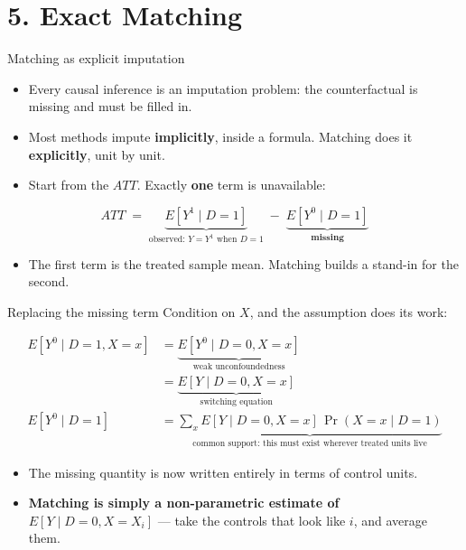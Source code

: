\documentclass[
  11pt,
  ignorenonframetext,
  aspectratio=169,
]{beamer}
\providecommand{\tightlist}{%
  \setlength{\itemsep}{0pt}\setlength{\parskip}{0pt}}
\begin{document}
\section{5. Exact Matching}\label{exact-matching}

\begin{frame}{Matching as explicit imputation}
\protect{}\label{matching-as-explicit-imputation}
\begin{itemize}
\tightlist
\item
  Every causal inference is an imputation problem: the counterfactual is
  missing and must be filled in.
\item
  Most methods impute \textbf{implicitly}, inside a formula. Matching
  does it \textbf{explicitly}, unit by unit.
\item
  Start from the \(ATT\). Exactly \textbf{one} term is unavailable:
\end{itemize}

\[
ATT \;=\; \underbrace{E[Y^1 \mid D{=}1]}_{\text{observed: } Y = Y^1 \text{ when } D=1}
\;-\; \underbrace{E[Y^0 \mid D{=}1]}_{\textbf{missing}}
\]

\begin{itemize}
\tightlist
\item
  The first term is the treated sample mean. Matching builds a stand-in
  for the second.
\end{itemize}
\end{frame}

\begin{frame}{Replacing the missing term}
\protect{}\label{replacing-the-missing-term}
Condition on \(X\), and the assumption does its work:

\[
\begin{aligned}
E[Y^0 \mid D{=}1, X{=}x]
  &= \underbrace{E[Y^0 \mid D{=}0, X{=}x]}_{\text{weak unconfoundedness}} \\[0.2em]
  &= \underbrace{E[Y \mid D{=}0, X{=}x]}_{\text{switching equation}} \\[0.4em]
E[Y^0 \mid D{=}1]
  &= \underbrace{\sum_x E[Y \mid D{=}0, X{=}x]\,\Pr(X{=}x \mid D{=}1)}_{\text{common support: this must exist wherever treated units live}}
\end{aligned}
\]

\begin{itemize}
\tightlist
\item
  The missing quantity is now written entirely in terms of control
  units.
\item
  \textbf{Matching is simply a non-parametric estimate of
  \(E[Y \mid D{=}0, X{=}X_i]\)} --- take the controls that look like
  \(i\), and average them.
\end{itemize}
\end{frame}
\end{document}
